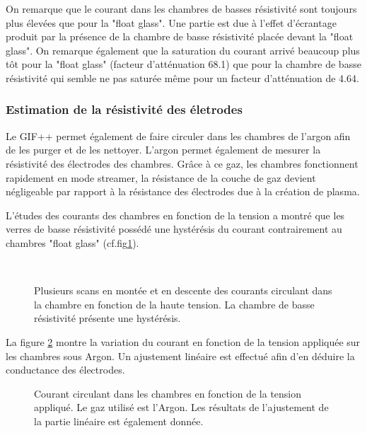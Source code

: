 On remarque que le courant dans les chambres de basses résistivité sont toujours plus élevées que pour la "float glass". Une partie est due à l'effet d'écrantage produit par la présence de la chambre de basse résistivité placée devant la "float glass". On remarque également que la saturation du courant arrivé beaucoup plus tôt pour la "float glass" (facteur d'atténuation 68.1) que pour la chambre de basse résistivité qui semble ne pas saturée même pour un facteur d'atténuation de 4.64.

\subsubsection{Estimation de la résistivité des életrodes}

Le GIF++ permet également de faire circuler dans les chambres de l'argon afin de les purger et de les nettoyer. L'argon permet également de mesurer la résistivité des électrodes des chambres. Grâce à ce gaz, les chambres fonctionnent rapidement en mode streamer, la résistance de la couche de gaz devient négligeable  par rapport à la résistance des électrodes due à la création de plasma. 

L'études des courants des chambres en fonction de la tension a montré que les verres de basse résistivité possédé une hystérésis du courant contrairement au chambres "float glass" (cf.fig\ref{hysteresis}).


\begin{figure}[ht!]
	\centering
	\\
	\caption{Plusieurs scans en montée et en descente  des courants circulant dans la chambre en fonction de la haute tension. La chambre de basse résistivité présente une hystérésis.}
	\label{hysteresis}
\end{figure}


La figure \ref{ScanArgon} montre la variation du courant en fonction de la tension appliquée sur les chambres sous Argon. Un ajustement linéaire est effectué afin d'en déduire la conductance des électrodes.

\begin{figure}[!ht]
	\centering
	\scalebox{1.2}{}
	\caption{Courant circulant dans les chambres en fonction de la tension appliqué. Le gaz utilisé est l'Argon. Les résultats de l'ajustement de la partie linéaire est également donnée.}
	\label{ScanArgon}
\end{figure}

